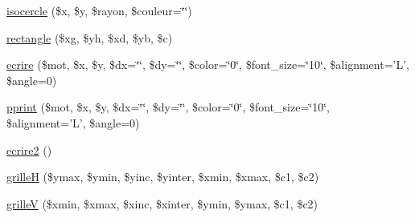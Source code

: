 \begin{CompactItemize}
\item 
\hyperlink{classCDessin_a17}{isocercle} (\$x, \$y, \$rayon, \$couleur=\char`\"{}\char`\"{})
\item 
\hyperlink{classCDessin_a18}{rectangle} (\$xg, \$yh, \$xd, \$yb, \$c)
\item 
\hyperlink{classCDessin_a19}{ecrire} (\$mot, \$x, \$y, \$dx=\char`\"{}\char`\"{}, \$dy=\char`\"{}\char`\"{}, \$color=\char`\"{}0\char`\"{}, \$font\_\-size=\char`\"{}10\char`\"{}, \$alignment='L', \$angle=0)
\item 
\hyperlink{classCDessin_a20}{pprint} (\$mot, \$x, \$y, \$dx=\char`\"{}\char`\"{}, \$dy=\char`\"{}\char`\"{}, \$color=\char`\"{}0\char`\"{}, \$font\_\-size=\char`\"{}10\char`\"{}, \$alignment='L', \$angle=0)
\item 
\hyperlink{classCDessin_a21}{ecrire2} ()
\item 
\hyperlink{classCDessin_a22}{grille\-H} (\$ymax, \$ymin, \$yinc, \$yinter, \$xmin, \$xmax, \$c1, \$c2)
\item 
\hyperlink{classCDessin_a23}{grille\-V} (\$xmin, \$xmax, \$xinc, \$xinter, \$ymin, \$ymax, \$c1, \$c2)
\end{CompactItemize}
